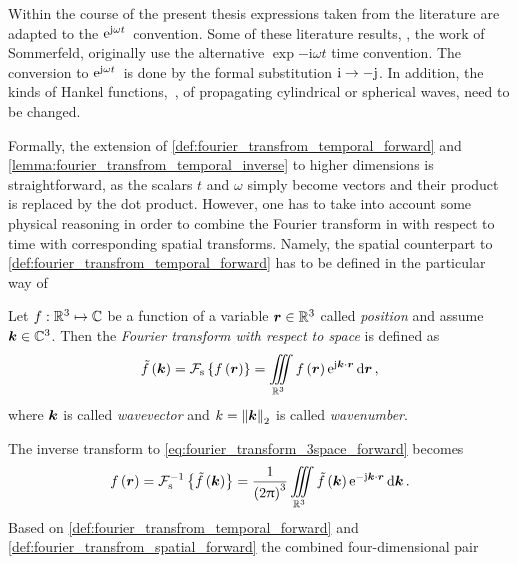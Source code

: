 Within the course of the present thesis expressions taken from the literature
are adapted to the $\mathrm{e}^{\mathrm{j} \omega t}\,$ convention.
Some of these literature results, \eg, the work of Sommerfeld, originally use
the alternative $\exp{-\mathrm{i} \omega t}$ time convention.
The conversion to $\mathrm{e}^{\mathrm{j} \omega t}\,$ is done by the formal substitution
$\mathrm{i} \to -\mathrm{j}$.
In addition, the kinds of Hankel functions,~\ie, of propagating cylindrical or
spherical waves, need to be changed.

Formally, the extension of \cref{def:fourier_transfrom_temporal_forward}
and \cref{lemma:fourier_transfrom_temporal_inverse} to higher
dimensions is straightforward, as the scalars $t$ and $\omega$ simply become
vectors and their product is replaced by the dot product.
However, one has to take into account some physical reasoning in order to
combine the Fourier transform in with respect to time with corresponding spatial
transforms.
Namely, the spatial counterpart to
\cref{def:fourier_transfrom_temporal_forward} has to be defined in the
particular way of
\begin{definition}
	\label{def:fourier_transfrom_spatial_forward}
	Let $f: \mathbb{R}^3 \mapsto \mathbb{C}$ be a function of a variable $\pvec{r} \in \R^3$
	called \emph{position} and assume $\pvec{k} \in \C^3$.
	Then the \emph{Fourier transform with respect to space} is defined as
	\begin{equation}\label{eq:fourier_transform_3space_forward}
		\tilde{f} \left( \pvec{k} \right) = 
		\fourierTransformSpatial \left\{f \left(\pvec{r}\right)\right\} = 
		\iiint\limits_{\R^3}  
		f \left( \pvec{r} \right)
		\exp{\im \pvec{k} \cdot \pvec{r}}
		\dd \pvec{r}
		\, , 
	\end{equation}
	where $\pvec{k}$ is called \emph{wavevector} and
	$k = \euclideanNorm{\pvec{k}}$ is called \emph{wavenumber}.
\end{definition}
The inverse transform to \eqref{eq:fourier_transform_3space_forward} becomes
\begin{equation}\label{eq:fourier_transform_3space_backward}
	f \left( \pvec{r} \right) = 
	\fourierTransformSpatialInverse
	\left\{\tilde{f}\left(\pvec{k}\right)\right\} = 
	\frac{1}{\left( 2\pi \right)^3}
	\iiint\limits_{\R^3} 
	\tilde{f} \left( \pvec{k} \right)
	\exp{-\im \pvec{k} \cdot \pvec{r}}
	\dd \pvec{k}
	\, .
\end{equation}
Based on \cref{def:fourier_transfrom_temporal_forward} and
\cref{def:fourier_transfrom_spatial_forward} the combined four-dimensional pair
